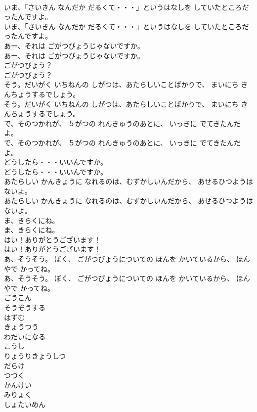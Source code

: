 \documentclass[8pt]{extreport}
\begin{document}
\begin{CJK}{UTF8}{min}
\\	いま、「さいきん なんだか だるくて・・・」というはなしを していたところだったんですよ。	
\\	いま、「さいきん なんだか だるくて・・・」というはなしを していたところだったんですよ。 
\\	あー、それは ごがつびょうじゃないですか。	
\\	あー、それは ごがつびょうじゃないですか。 
\\	ごがつびょう？	
\\	ごがつびょう？ 
\\	そう。だいがく いちねんの しがつは、あたらしいことばかりで、 まいにち きんちょうするでしょう。	
\\	そう。だいがく いちねんの しがつは、あたらしいことばかりで、 まいにち きんちょうするでしょう。 
\\	で、そのつかれが、 ５がつの れんきゅうのあとに、 いっきに でてきたんだよ。	
\\	で、そのつかれが、 ５がつの れんきゅうのあとに、 いっきに でてきたんだよ。 
\\	どうしたら・・・いいんですか。	
\\	どうしたら・・・いいんですか。 
\\	あたらしい かんきょうに なれるのは、むずかしいんだから、 あせるひつようは ないよ。	
\\	あたらしい かんきょうに なれるのは、むずかしいんだから、 あせるひつようは ないよ。 
\\	ま、きらくにね。	
\\	ま、きらくにね。 
\\	はい！ありがとうございます！	
\\	はい！ありがとうございます！ 
\\	あ、そうそう。 ぼく、 ごがつびょうについての ほんを かいているから、 ほんやで かってね。	
\\	あ、そうそう。 ぼく、 ごがつびょうについての ほんを かいているから、 ほんやで かってね。 
\\	ごうこん
\\	そうぞうする
\\	はずむ
\\	きょうつう
\\	わだいになる
\\	こうし
\\	りょうりきょうしつ
\\	だらけ
\\	つづく
\\	かんけい
\\	みりょく
\\	しょたいめん

\end{CJK}
\end{document}
